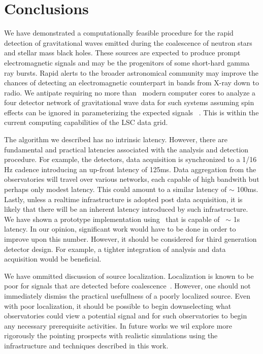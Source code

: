 \section{Conclusions}
\label{SECV}\label{sec:conclusions}

We have demonstrated a computationally feasible procedure for the rapid
detection of gravitational waves emitted during the coalescence of neutron
stars and stellar mass black holes.  These sources are expected to produce
prompt electromagnetic signals and may be the progenitors of some short-hard
gamma ray bursts.  Rapid alerts to the broader astronomical community may
improve the chances of detecting an electromagnetic counterpart in bands from
X-ray down to radio.  We antipate requiring no more than \numcpus\ modern
computer cores to analyze a four detector network of gravitational wave data
for such systems assuming spin effects can be ignored in parameterizing the
expected signals ~\cite{the-papers-that-say-that-is-okay}.  This is within the
current computing capabilities of the LSC data grid\cite{LDG}.

The algorithm we described has no intrinsic latency.  However, there are
fundamental and practical latencies associated with the analysis and detection
procedure. For example, the \LIGO detectors, data acquisition is synchronized
to a 1/16 Hz cadence introducing an up-front latency of 125ms.  Data
aggregation from the observatories will travel over various networks, each
capable of high bandwith but perhaps only modest latency.  This could amount to
a similar latency of $\sim$ 100ms.  Lastly, unless a realtime infrastructure is
adopted post data acquisition, it is likely that there will be an inherent
latency introduced by such infrastructure.  We have shown a prototype
implementation using \gstlal\ that is capable of ~$\sim$ 1s latency. In our
opinion, significant work would have to be done in order to improve upon this
number. However, it should be considered for third generation detector design.
For example, a tighter integration of analysis and data acquisition would be
beneficial.

We have ommitted discussion of source localization.  Localization is known to
be poor for signals that are detected before coalescence~\cite{fairhurst}.
However, one should not immediately dismiss the practical usefullness of a
poorly localized source.  Even with poor localization, it should be possible to
begin downselecting what observatories could view a potential signal and for
such observatories to begin any necessary prerequisite activities.  In future
works we wil explore more rigorously the pointing prospects with realistic
simulations using the infrastructure and techniques described in this work.

